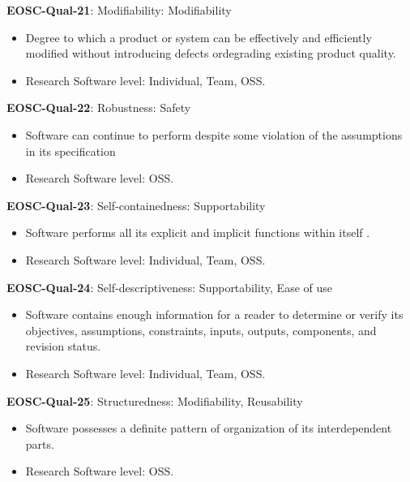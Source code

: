 \textbf{EOSC-Qual-21}: Modifiability: Modifiability

\begin{itemize}
    \item Degree to which a product or system can be effectively and efficiently modified without introducing defects ordegrading existing product quality.~\cite{iso_25010_2011_2017,boehm_quantitative_1976}
    \item Research Software level: Individual, Team, OSS.
\end{itemize}

\textbf{EOSC-Qual-22}: Robustness: Safety

\begin{itemize}
    \item Software can continue to perform despite some violation of the assumptions in its specification~\cite{boehm_quantitative_1976}
    \item Research Software level: OSS.
\end{itemize}

\textbf{EOSC-Qual-23}: Self-containedness: Supportability

\begin{itemize}
    \item Software performs all its explicit and implicit functions within itself .~\cite{boehm_quantitative_1976}
    \item Research Software level: Individual, Team, OSS.
\end{itemize}

\textbf{EOSC-Qual-24}: Self-descriptiveness: Supportability, Ease of use

\begin{itemize}
    \item Software contains enough information for a reader to determine or verify its objectives, assumptions, constraints, inputs, outputs, components, and revision status.~\cite{boehm_quantitative_1976}
    \item Research Software level: Individual, Team, OSS.
\end{itemize}

\textbf{EOSC-Qual-25}: Structuredness: Modifiability, Reusability

\begin{itemize}
    \item Software possesses a definite pattern of organization of its interdependent parts.~\cite{boehm_quantitative_1976}
    \item Research Software level: OSS.
\end{itemize}

